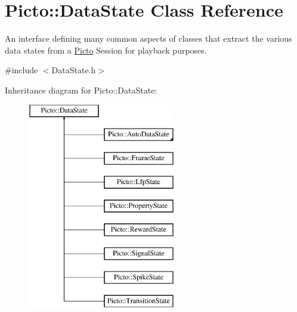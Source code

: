 \hypertarget{class_picto_1_1_data_state}{\section{Picto\-:\-:Data\-State Class Reference}
\label{class_picto_1_1_data_state}
}


An interface defining many common aspects of classes that extract the various data states from a \hyperlink{namespace_picto}{Picto} Session for playback purposes.  




{\ttfamily \#include $<$Data\-State.\-h$>$}

Inheritance diagram for Picto\-:\-:Data\-State\-:\begin{figure}[H]
\begin{center}
\leavevmode
\includegraphics[height=9.000000cm]{class_picto_1_1_data_state}
\end{center}
\end{figure}
